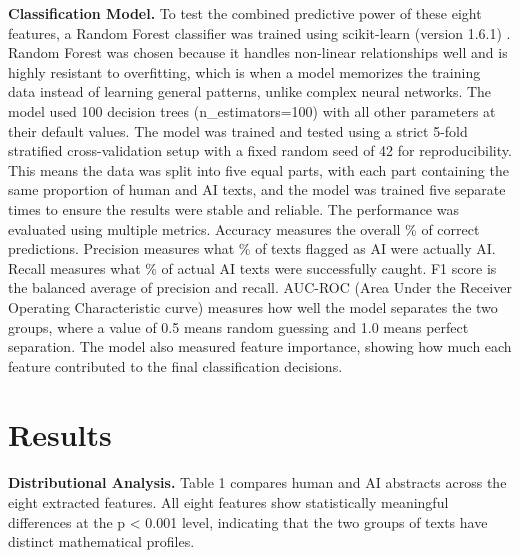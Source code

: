 \documentclass{article}
\begin{document}
\textbf{Classification Model.} To test the combined predictive power of these eight features, a Random Forest classifier was trained using scikit-learn (version 1.6.1) \cite{ref16}. Random Forest was chosen because it handles non-linear relationships well and is highly resistant to overfitting, which is when a model memorizes the training data instead of learning general patterns, unlike complex neural networks. The model used 100 decision trees (n\_estimators=100) with all other parameters at their default values. The model was trained and tested using a strict 5-fold stratified cross-validation setup with a fixed random seed of 42 for reproducibility. This means the data was split into five equal parts, with each part containing the same proportion of human and AI texts, and the model was trained five separate times to ensure the results were stable and reliable. The performance was evaluated using multiple metrics. Accuracy measures the overall \% of correct predictions. Precision measures what \% of texts flagged as AI were actually AI. Recall measures what \% of actual AI texts were successfully caught. F1 score is the balanced average of precision and recall. AUC-ROC (Area Under the Receiver Operating Characteristic curve) measures how well the model separates the two groups, where a value of 0.5 means random guessing and 1.0 means perfect separation. The model also measured feature importance, showing how much each feature contributed to the final classification decisions.

\section{Results}

\textbf{Distributional Analysis.} Table 1 compares human and AI abstracts across the eight extracted features. All eight features show statistically meaningful differences at the p < 0.001 level, indicating that the two groups of texts have distinct mathematical profiles.
\end{document}
